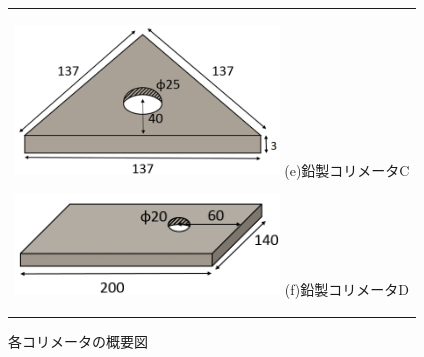 \begin{figure}[H]
	\centering
		\begin{tabular}{c}
			\begin{minipage}{0.5\hsize}
				\centering
					\includegraphics[width=70mm]{fig/isb/leadcollimator2.png}
					\hspace{1.6cm} (e)鉛製コリメータC
			\end{minipage}
			\begin{minipage}{0.5\hsize}
				\centering
					\includegraphics[width=70mm]{fig/isb/leadcollimator1.png}
					\hspace{1.6cm} (f)鉛製コリメータD
			\end{minipage}
		\end{tabular}
		\caption{各コリメータの概要図}
		\label{collimators}
\end{figure}
\newpage
